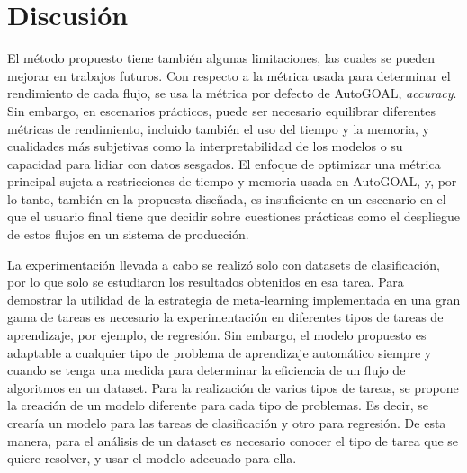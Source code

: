 
\section{Discusión}\label{sec:discusion}

%
%
%	
%	
%	


El método propuesto tiene también algunas limitaciones, las cuales se pueden mejorar en trabajos futuros. Con respecto a la métrica usada para determinar el rendimiento de cada flujo, se usa la métrica por defecto de AutoGOAL, \textit{accuracy}. Sin embargo, en escenarios prácticos, puede ser necesario equilibrar diferentes métricas de rendimiento, incluido también el uso del tiempo y la memoria, y cualidades más subjetivas como la interpretabilidad de los modelos o su capacidad para lidiar con datos sesgados. El enfoque de optimizar una métrica principal sujeta a restricciones de tiempo y memoria usada en AutoGOAL, y, por lo tanto, también en la propuesta diseñada, es insuficiente en un escenario en el que el usuario final tiene que decidir sobre cuestiones prácticas como el despliegue de estos flujos en un sistema de producción. %

La experimentación llevada a cabo se realizó solo con datasets de clasificación, por lo que solo se estudiaron los resultados obtenidos en esa tarea. Para demostrar la utilidad de la estrategia de meta-learning implementada en una gran gama de tareas es necesario la experimentación en diferentes tipos de tareas de aprendizaje, por ejemplo, de regresión.  Sin embargo, el modelo propuesto es adaptable a cualquier tipo de problema de aprendizaje automático siempre y cuando se tenga una medida para determinar la eficiencia de un flujo de algoritmos en un dataset. Para la realización de varios tipos de tareas, se propone la creación de un modelo diferente para cada tipo de problemas. Es decir, se crearía un modelo para las tareas de clasificación y otro para regresión. De esta manera, para el análisis de un dataset es necesario conocer el tipo de tarea que se quiere resolver, y usar el modelo adecuado para ella.

